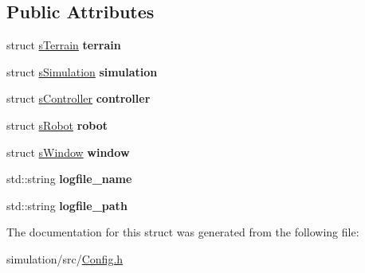\subsection*{Public Attributes}
\begin{DoxyCompactItemize}
\item 
\mbox{\label{structconfig_1_1s_config_aca277421f902bb9f2c25b9428a9957b3}} 
struct \mbox{\hyperlink{structconfig_1_1s_terrain}{s\+Terrain}} {\bfseries terrain}
\item 
\mbox{\label{structconfig_1_1s_config_a057b9b1fa05fb7b024ff6c20ab93e5e2}} 
struct \mbox{\hyperlink{structconfig_1_1s_simulation}{s\+Simulation}} {\bfseries simulation}
\item 
\mbox{\label{structconfig_1_1s_config_af6a5e9f0eb966ad92a2fd7428d5ee17e}} 
struct \mbox{\hyperlink{structconfig_1_1s_controller}{s\+Controller}} {\bfseries controller}
\item 
\mbox{\label{structconfig_1_1s_config_aa02aeb8d778bbe36900505ea0b844404}} 
struct \mbox{\hyperlink{structconfig_1_1s_robot}{s\+Robot}} {\bfseries robot}
\item 
\mbox{\label{structconfig_1_1s_config_a397d5923dd1cb6a1cf49df3d62872a98}} 
struct \mbox{\hyperlink{structconfig_1_1s_window}{s\+Window}} {\bfseries window}
\item 
\mbox{\label{structconfig_1_1s_config_a92296b4802c10df4be246afb182b34ba}} 
std\+::string {\bfseries logfile\+\_\+name}
\item 
\mbox{\label{structconfig_1_1s_config_a140ad96bb800b9a2316e1c726a033c36}} 
std\+::string {\bfseries logfile\+\_\+path}
\end{DoxyCompactItemize}


The documentation for this struct was generated from the following file\+:\begin{DoxyCompactItemize}
\item 
simulation/src/\mbox{\hyperlink{_config_8h}{Config.\+h}}\end{DoxyCompactItemize}
